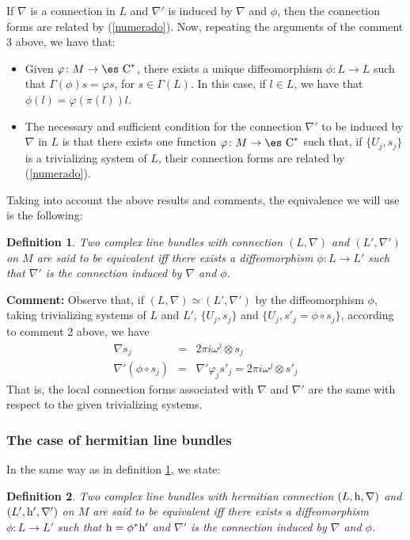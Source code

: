 \documentclass[12pt]{article}
\newtheorem{definition}{Definition}
\def\beann{\begin{eqnarray*}}
\def\eeann{\end{eqnarray*}}
\def\h{{\rm h}}
\def\Complex{\mbox{\es C}}
\begin{document}
\begin{enumerate}
If $\nabla$ is a connection in $L$ and
$\nabla '$ is induced by $\nabla$ and $\phi$,
then the connection forms are related by (\ref{numerado}).
Now, repeating the arguments of the comment 3 above, we have that:
\begin{itemize}
\item
Given $\varphi \colon M \to \Complex^*$,
there exists a unique diffeomorphism
$\phi \colon L \to L$
such that $\Gamma (\phi )s = \varphi s$,
for $s \in \Gamma (L)$.
In this case, if $l \in L$,
we have that $\phi (l) = \varphi (\pi (l))l$.
\item
The necessary and sufficient condition for
the connection $\nabla '$ to be induced by
$\nabla$ in $L$ is that there exists one function
$\varphi \colon M \to \Complex^*$
such that, if $\{ U_j,s_j \}$ is a trivializing system of $L$,
their connection forms are related by (\ref{numerado}).
\end{itemize}
\end{enumerate}

Taking into account the above results and comments,
the equivalence we will use is the following:

\begin{definition}
Two complex line bundles with connection
$(L,\nabla )$ and $(L',\nabla ')$ on $M$
are said to be
{\rm equivalent}
iff there exists a diffeomorphism
$\phi \colon L \to L'$
such that $\nabla '$ is the connection induced
by $\nabla$ and $\phi$.
\label{lbce}
\end{definition}

{\bf Comment:}
Observe that, if
$(L,\nabla ) \simeq (L',\nabla ')$
by the diffeomorphism $\phi$,
taking trivializing systems of $L$ and $L'$,
$\{ U_j,s_j \}$ and $\{ U_j,s'_j=\phi \circ s_j \}$,
according to comment 2 above, we have
\beann
\nabla s_j
&=&
2\pi i \omega^j \otimes s_j
\\
\nabla ' (\phi \circ s_j)
&=&
\nabla' \varphi_j s'_j = 2\pi i \omega^j \otimes s'_j
\eeann
That is, the local connection forms associated with
$\nabla$ and $\nabla '$ are the same
with respect to the given trivializing systems.


\subsubsection{The case of hermitian line bundles}


In the same way as in definition \ref{lbce}, we state:

\begin{definition}
Two complex line bundles with hermitian connection
$(L,\h ,\nabla )$ and
$(L',\h ',\nabla ')$ on $M$
are said to be {\rm equivalent}
iff there exists a diffeomorphism
$\phi \colon L \to L'$ such that
$\h = \phi^*\h '$ and $\nabla '$
is the connection induced by $\nabla$ and $\phi$.
\label{clbhc}
\end{definition}
\end{document}
